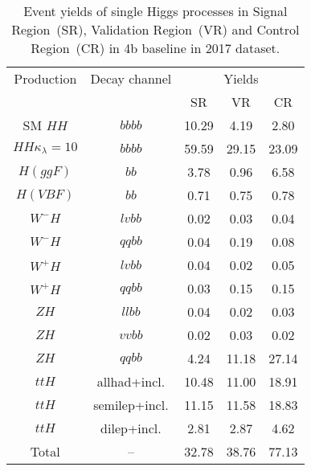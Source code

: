 
\begin{table}[h]
    \centering
    \caption{Event yields of single Higgs processes in Signal Region~(SR), Validation Region~(VR) 
             and Control Region~(CR) in 4b baseline in 2017 dataset.}
    \vspace{1.5mm}
    \begin{tabular}{ccccc}
        \hline
        Production & Decay channel & \multicolumn{3}{c}{Yields} \\
                   &               & SR & VR & CR \\
        \hline
        SM $HH$                & $bbbb$ & 10.29 & 4.19 & 2.80 \\
        $HH \kappa_\lambda=10$ & $bbbb$ & 59.59 & 29.15 & 23.09 \\
        \hline
        $H (ggF)$  & $bb$          & 3.78 & 0.96 & 6.58 \\
        $H (VBF)$  & $bb$          & 0.71 & 0.75 & 0.78 \\
        $W^{-}H$   & $lvbb$        & 0.02 & 0.03 & 0.04 \\
        $W^{-}H$   & $qqbb$        & 0.04 & 0.19 & 0.08 \\
        $W^{+}H$   & $lvbb$        & 0.04 & 0.02 & 0.05 \\
        $W^{+}H$   & $qqbb$        & 0.03 & 0.15 & 0.15 \\
        $ZH$       & $llbb$        & 0.04 & 0.02  & 0.03 \\
        $ZH$       & $vvbb$        & 0.02 & 0.03 & 0.02 \\
        $ZH$       & $qqbb$        & 4.24 & 11.18 & 27.14 \\
        $ttH$      & allhad+incl.  & 10.48 & 11.00 & 18.91 \\
        $ttH$      & semilep+incl. & 11.15 & 11.58& 18.83 \\
        $ttH$      & dilep+incl.   & 2.81 & 2.87 & 4.62 \\
        \hline
        Total      & --            & 32.78 & 38.76 & 77.13 \\
    \end{tabular}
    \label{tabel:single-higgs-yields-4b}
\end{table}
